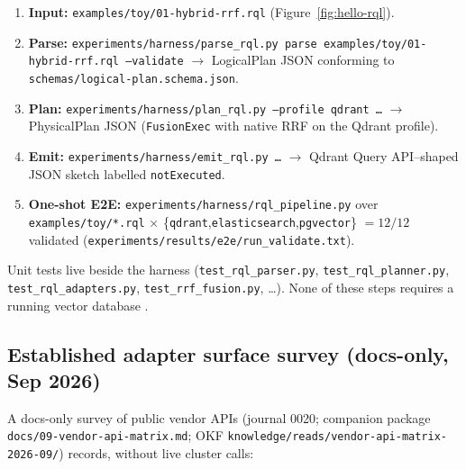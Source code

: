\begin{enumerate}[leftmargin=*]
  \item \textbf{Input:} \texttt{examples/toy/01-hybrid-rrf.rql} (Figure~\ref{fig:hello-rql}).
  \item \textbf{Parse:} \texttt{experiments/harness/parse\_rql.py parse examples/toy/01-hybrid-rrf.rql --validate}
        $\rightarrow$ LogicalPlan JSON conforming to \texttt{schemas/logical-plan.schema.json}.
  \item \textbf{Plan:} \texttt{experiments/harness/plan\_rql.py --profile qdrant \ldots}
        $\rightarrow$ PhysicalPlan JSON (\texttt{FusionExec} with native RRF on the Qdrant profile).
  \item \textbf{Emit:} \texttt{experiments/harness/emit\_rql.py \ldots}
        $\rightarrow$ Qdrant Query API--shaped JSON sketch labelled \texttt{notExecuted}.
  \item \textbf{One-shot E2E:} \texttt{experiments/harness/rql\_pipeline.py} over \texttt{examples/toy/*.rql}
        $\times$ \{\texttt{qdrant},\texttt{elasticsearch},\texttt{pgvector}\} $= 12/12$ validated
        (\texttt{experiments/results/e2e/run\_validate.txt}).
\end{enumerate}
Unit tests live beside the harness (\texttt{test\_rql\_parser.py}, \texttt{test\_rql\_planner.py}, \texttt{test\_rql\_adapters.py}, \texttt{test\_rrf\_fusion.py}, \ldots).
None of these steps requires a running vector database \hypothesis{}.

\subsection{Established adapter surface survey (docs-only, Sep 2026)}
\label{sec:vendor-matrix}
A docs-only survey of public vendor APIs (journal 0020; companion package \texttt{docs/09-vendor-api-matrix.md}; OKF \texttt{knowledge/reads/vendor-api-matrix-2026-09/}) records, without live cluster calls:

